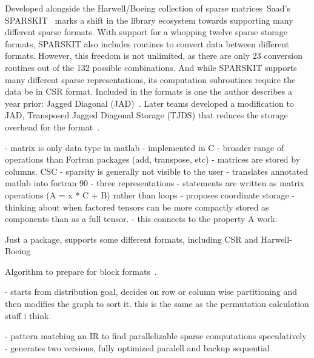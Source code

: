 Developed alongside the Harwell/Boeing collection of sparse matrices~\cite{duff1989sparse}Saad's SPARSKIT~\cite{saad1990sparskit} marks a shift in the library ecosystem towards supporting many different sparse formats. 
With support for a whopping twelve sparse storage formats, SPARSKIT also includes routines to convert data between different formats. 
However, this freedom is not unlimited, as there are only 23 conversion routines out of the 132 possible combinations. 
And while SPARSKIT supports many different sparse representations, its computation subroutines require the data be in CSR format. 
Included in the formats is one the author describes a year prior: Jagged Diagonal (JAD)~\cite{saad1989krylov}.
Later teams developed a modification to JAD, Transposed Jagged Diagonal Storage (TJDS) that reduces the storage overhead for the format~\cite{montagne2004optimal}.

\cite{shahnaz2005review}


\cite{duff1989sparse}
\cite{floridasparsematrixsuite}
\cite{splatt}



\cite{gilbert1992sparse}
- matrix is only data type in matlab
- implemented in C
- broader range of operations than Fortran packages (add, transpose, etc)
- matrices are stored by columns. CSC
- sparsity is generally not visible to the user
\cite{kawabata2004matlab}
- translates annotated matlab into fortran 90
- three representations
- statements are written as matrix operations (A = x * C + B) rather than loops
\cite{bader2008efficient}
- proposes coordinate storage
- thinking about when factored tensors can be more compactly stored as components than as a full tensor.
- this connects to the property A work.

Just a package, supports some different formats, including CSR and Harwell-Boeing~\cite{koenker2003sparsem}


Algorithm to prepare for block formats~\cite{pothen1990computing}.

\cite{catalyurek1999hypergraph}
- starts from distribution goal, decides on row or column wise partitioning and then modifies the graph to sort it. this is the same as the permutation calculation stuff i think.


\cite{kessler1999sparamat}
- pattern matching an IR to find parallelizable sparse computations speculatively
- generates two versions, fully optimized paralell and backup sequential


